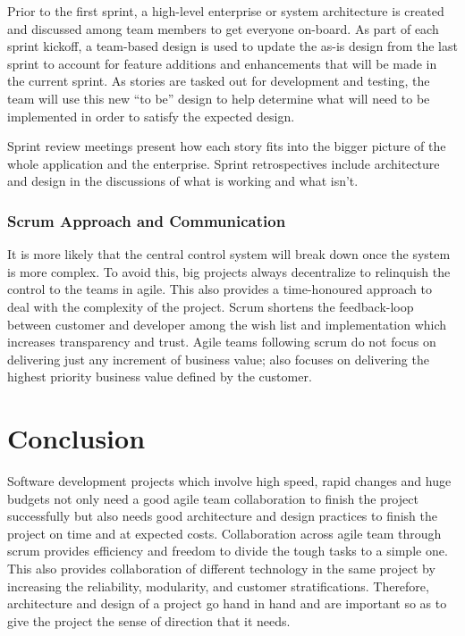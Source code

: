\documentclass[sigplan,screen]{acmart}
\begin{document}
Prior to the first sprint, a high-level enterprise or system architecture is created and discussed among team members to get everyone on-board. As part of each sprint kickoff, a team-based design is used to update the as-is design from the last sprint to account for feature additions and enhancements that will be made in the current sprint. As stories are tasked out for development and testing, the team will use this new “to be” design to help determine what will need to be implemented in order to satisfy the expected design. \cite{Architecture01}

Sprint review meetings present how each story fits into the bigger picture of the whole application and the enterprise. Sprint retrospectives include architecture and design in the discussions of what is working and what isn’t.

\subsubsection{Scrum Approach and Communication}

It is more likely that the central control system will break down once the system is more complex. 
To avoid this, big projects always decentralize to relinquish the control to the teams in agile. This also provides a time-honoured approach to deal with the complexity of the project.\cite{book01} Scrum shortens the feedback-loop between customer and developer among the wish list and implementation which increases transparency and trust. Agile teams following scrum do not focus on delivering just any increment of business value; also focuses on delivering the highest priority business value defined by the customer.



\section{Conclusion}
Software development projects which involve high speed, rapid changes and huge budgets not only need a good agile team collaboration to finish the project successfully but also needs good architecture and design practices to finish the project on time and at expected costs.  Collaboration across agile team through scrum provides efficiency and freedom to divide the tough tasks to a simple one. This also provides collaboration of different technology in the same project by increasing the reliability, modularity, and customer stratifications. Therefore, architecture and design of a project go hand in hand and are important so as to give the project the sense of direction that it needs.

%



% 
\appendix
\end{document}
